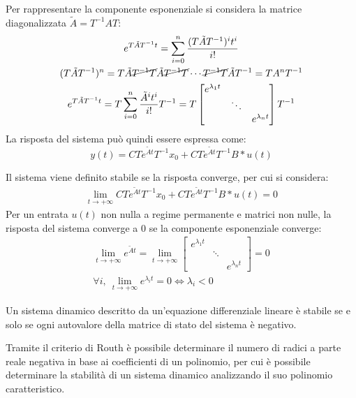 \documentclass{article}
\numberwithin{equation}{subsection}
\begin{document}
Per rappresentare la componente esponenziale si considera la matrice diagonalizzata $\tilde A=T^{-1}AT$:
\begin{gather*}
    \displaystyle e^{T\tilde A T^{-1}t}=\sum_{i=0}^n\frac{(T\tilde AT^{-1})^it^i}{i!}\\
    (T\tilde{A}T^{-1})^n=T\tilde{A}\cancel{T^{-1}T}\tilde{A}\cancel{T^{-1}T}\cdots\cancel{T^{-1}T}\tilde{A}T^{-1}=TA^nT^{-1}\\
    \displaystyle e^{T\tilde A T^{-1}t}=T\sum_{i=0}^n\frac{\tilde A^it^i}{i!}T^{-1}=T 
    \begin{bmatrix}
        e^{\lambda_1t} & & \\
        & \ddots & \\
        & & e^{\lambda_nt}
    \end{bmatrix}T^{-1}
\end{gather*}
La risposta del sistema può quindi essere espressa come:
\begin{equation*}
    y(t)=CTe^{\tilde{A}t}T^{-1}x_0+CTe^{\tilde{A}t}T^{-1}B*u(t)
\end{equation*}

Il sistema viene definito stabile se la risposta converge, per cui si considera:
\begin{gather*}
    \lim_{t\to+\infty}CTe^{\tilde{A}t}T^{-1}x_0+CTe^{\tilde{A}t}T^{-1}B*u(t)=0
\end{gather*}
Per un entrata $u(t)$ non nulla a regime permanente e matrici non nulle, la risposta del sistema converge a $0$ se la componente esponenziale converge:
\begin{gather*}
    \lim_{t\to+\infty}e^{\tilde{A}t}=\lim_{t\to+\infty}\begin{bmatrix}
        e^{\lambda_1t} & & \\
        & \ddots & \\
        & & e^{\lambda_nt}  
    \end{bmatrix}=0\\
    \forall i,\:\lim_{t\to+\infty}e^{\lambda_it}=0\iff \lambda_i<0
\end{gather*}

Un sistema dinamico descritto da un'equazione differenziale lineare è stabile se e solo se ogni autovalore della matrice di stato del sistema è negativo. 

Tramite il criterio di Routh è possibile determinare il numero di radici a parte reale negativa in base ai coefficienti di un polinomio, per cui è possibile determinare 
la stabilità di un sistema dinamico analizzando il suo polinomio caratteristico. 
\end{document}
